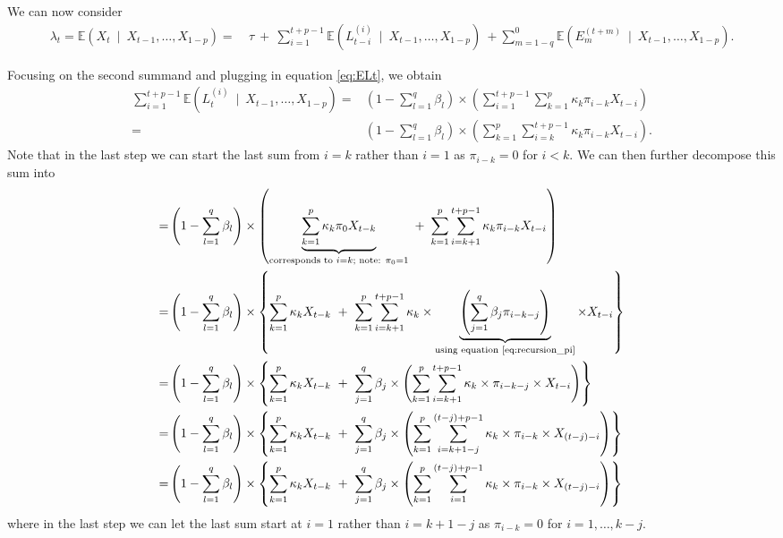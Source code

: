 \documentclass{article}
\begin{document}
We can now consider
\begin{align}
\lambda_t = \mathbb{E}(X_t \ \mid \ X_{t - 1}, \dots, X_{1 - p}) = & \ \tau 
\ + \ \sum_{i = 1}^{t + p - 1}\mathbb{E}(L^{(i)}_{t - i} \ \mid \ X_{t - 1}, \dots, X_{1 - p})
\ + \sum_{m = 1 - q}^0 \mathbb{E}(E_{m}^{(t + m)}  \ \mid \ X_{t - 1}, \dots, X_{1 - p}).\label{eq:lambda_t_pq_recursion1}
\end{align}

Focusing on the second summand and plugging in equation \eqref{eq:ELt}, we obtain
\begin{align*}
\sum_{i = 1}^{t + p - 1}\mathbb{E}(L^{(i)}_t \ \mid \ X_{t - 1}, \dots, X_{1 - p}) = & \left(1 - \sum_{l = 1}^q \beta_l\right) \times \left( \sum_{i = 1}^{t + p - 1} \sum_{k = 1}^p \kappa_k \pi_{i - k} X_{t - i}\right)\\
= & \left(1 - \sum_{l = 1}^q \beta_l\right) \times \left(\sum_{k = 1}^p \sum_{i = k}^{t + p - 1} \kappa_k \pi_{i - k} X_{t - i}\right).
\end{align*}
Note that in the last step we can start the last sum from $i = k$ rather than $i = 1$ as $\pi_{i - k} = 0$ for $i < k$. We can then further decompose this sum into
\begin{align}
= & \left(1 - \sum_{l = 1}^q \beta_l\right) \times \left(\underbrace{\sum_{k = 1}^p \kappa_k \pi_0 X_{t - k}}_{\text{corresponds to } i = k; \text{ note: } \pi_0 = 1} \ + \ \sum_{k = 1}^p \sum_{i = k + 1}^{t + p - 1} \kappa_k \pi_{i - k} X_{t - i}\right)\nonumber\\
= & \left(1 - \sum_{l = 1}^q \beta_l\right) \times \left\{\sum_{k = 1}^p \kappa_k X_{t - k} \ + \ \sum_{k = 1}^p \sum_{i = k + 1}^{t + p - 1} \kappa_k \times \underbrace{\left(\sum_{j = 1}^q \beta_j \pi_{i - k - j}\right)}_{\text{using equation \eqref{eq:recursion_pi}}} \times X_{t - i}\right\}\nonumber\\
= & \left(1 - \sum_{l = 1}^q \beta_l\right) \times \left\{\sum_{k = 1}^p \kappa_k X_{t - k} \ + \ \sum_{j = 1}^q \beta_j \times \left(\sum_{k = 1}^p \sum_{i = k + 1}^{t + p - 1} \kappa_k \times \pi_{i - k - j} \times X_{t - i}\right)\right\}\nonumber\\
= & \left(1 - \sum_{l = 1}^q \beta_l\right) \times \left\{\sum_{k = 1}^p \kappa_k X_{t - k} \ + \ \sum_{j = 1}^q \beta_j \times \left(\sum_{k = 1}^p \sum_{i = k + 1 - j}^{(t - j) + p - 1} \kappa_k \times \pi_{i - k} \times X_{(t - j) - i}\right)\right\}\nonumber\\
= & \left(1 - \sum_{l = 1}^q \beta_l\right) \times \left\{\sum_{k = 1}^p \kappa_k X_{t - k} \ + \ \sum_{j = 1}^q \beta_j \times \left(\sum_{k = 1}^p \sum_{i = 1}^{(t - j) + p - 1} \kappa_k \times \pi_{i - k} \times X_{(t - j) - i}\right)\right\}\label{eq:substitution_ELt}
\end{align}
where in the last step we can let the last sum start at $i = 1$ rather than $i = k + 1 - j$ as $\pi_{i - k} = 0$ for $i = 1, \dots, k - j$.
\end{document}

